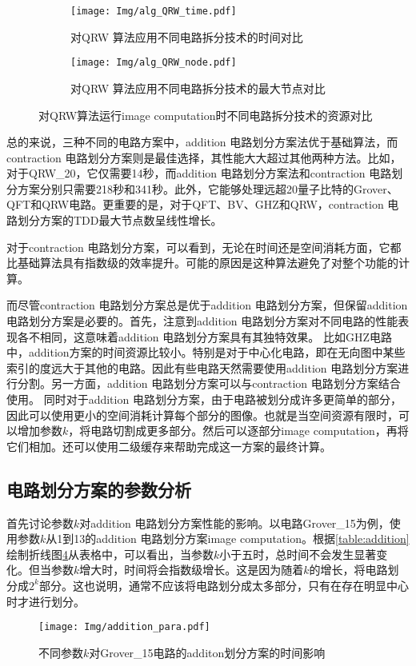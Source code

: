 \begin{figure}[!htbp]
    \centering
    \begin{subfigure}[b]{.4\textwidth}
        \centering
        \texttt{[image: Img/alg\_QRW\_time.pdf]}
        \caption{对QRW 算法应用不同电路拆分技术的时间对比}
        \label{fig:QRW-time}
    \end{subfigure}
    \qquad
    \begin{subfigure}[b]{.4\textwidth}
        \centering
        \texttt{[image: Img/alg\_QRW\_node.pdf]}
        \caption{对QRW 算法应用不同电路拆分技术的最大节点对比}
        \label{fig:QRW-node}
    \end{subfigure}
    \caption{对QRW算法运行image computation时不同电路拆分技术的资源对比}
    \label{fig:QRW-compare}
\end{figure}

总的来说，三种不同的电路方案中，addition 电路划分方案法优于基础算法，而contraction 电路划分方案则是最佳选择，其性能大大超过其他两种方法。比如，对于QRW\_20，它仅需要14秒，而addition 电路划分方案法和contraction 电路划分方案分别只需要218秒和341秒。此外，它能够处理远超20量子比特的Grover、QFT和QRW电路。更重要的是，对于QFT、BV、GHZ和QRW，contraction 电路划分方案的TDD最大节点数呈线性增长。

对于contraction 电路划分方案，可以看到，无论在时间还是空间消耗方面，它都比基础算法具有指数级的效率提升。可能的原因是这种算法避免了对整个功能的计算。

而尽管contraction 电路划分方案总是优于addition 电路划分方案，但保留addition 电路划分方案是必要的。首先，注意到addition 电路划分方案对不同电路的性能表现各不相同，这意味着addition 电路划分方案具有其独特效果。
比如GHZ电路中，addition方案的时间资源比较小。特别是对于中心化电路，即在无向图中某些索引的度远大于其他的电路。因此有些电路天然需要使用addition 电路划分方案进行分割。另一方面，addition 电路划分方案可以与contraction 电路划分方案结合使用。
同时对于addition 电路划分方案，由于电路被划分成许多更简单的部分，因此可以使用更小的空间消耗计算每个部分的图像。也就是当空间资源有限时，可以增加参数$k$，将电路切割成更多部分。然后可以逐部分image computation，再将它们相加。还可以使用二级缓存来帮助完成这一方案的最终计算。

\subsection*{电路划分方案的参数分析}
首先讨论参数$k$对addition 电路划分方案性能的影响。以电路Grover\_15为例，使用参数$k$从1到13的addition 电路划分方案image computation。根据\ref{table:addition}绘制折线图\ref{fig:addition-ex}从表格中，可以看出，当参数$k$小于五时，总时间不会发生显著变化。但当参数$k$增大时，时间将会指数级增长。这是因为随着$k$的增长，将电路划分成$2^k$部分。这也说明，通常不应该将电路划分成太多部分，只有在存在明显中心时才进行划分。
\begin{figure}
    \centering
    \texttt{[image: Img/addition\_para.pdf]}
    \caption{不同参数$k$对Grover\_15电路的additon划分方案的时间影响}
    \label{fig:addition-ex}
\end{figure}

